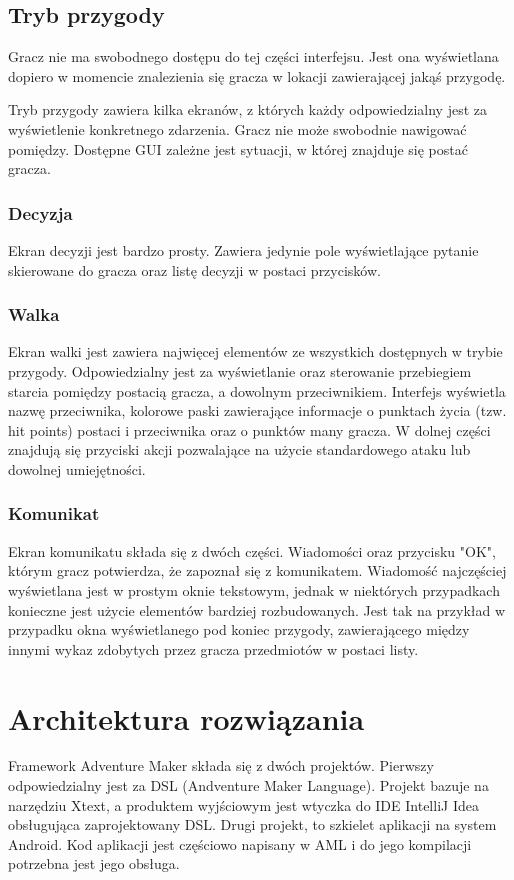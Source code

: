 \documentclass	{xmgr}
\begin{document}
\section{Tryb przygody}
Gracz nie ma swobodnego dostępu do tej części interfejsu. Jest ona wyświetlana dopiero w momencie znalezienia się gracza w lokacji zawierającej jakąś przygodę.

Tryb przygody zawiera kilka ekranów, z których każdy odpowiedzialny jest za wyświetlenie konkretnego zdarzenia. Gracz nie może swobodnie nawigować pomiędzy. Dostępne GUI zależne jest sytuacji, w której znajduje się postać gracza.
\subsection*{Decyzja}
Ekran decyzji jest bardzo prosty. Zawiera jedynie pole wyświetlające pytanie skierowane do gracza oraz listę decyzji w postaci przycisków.
\subsection*{Walka}
Ekran walki jest zawiera najwięcej elementów ze wszystkich dostępnych w trybie przygody. Odpowiedzialny jest za wyświetlanie oraz sterowanie przebiegiem starcia pomiędzy postacią gracza, a dowolnym przeciwnikiem. Interfejs wyświetla nazwę przeciwnika, kolorowe paski zawierające informacje o punktach życia (tzw. hit points) postaci i przeciwnika oraz o punktów many gracza. W dolnej części znajdują się przyciski akcji pozwalające na użycie standardowego ataku lub dowolnej umiejętności.
\subsection*{Komunikat}
Ekran komunikatu składa się z dwóch części. Wiadomości oraz przycisku "OK", którym gracz potwierdza, że zapoznał się z komunikatem. Wiadomość najczęściej wyświetlana jest w prostym oknie tekstowym, jednak w niektórych przypadkach konieczne jest użycie elementów bardziej rozbudowanych. Jest tak na przykład w przypadku okna wyświetlanego pod koniec przygody, zawierającego między innymi wykaz zdobytych przez gracza przedmiotów w postaci listy.

\chapter{Architektura rozwiązania}

Framework Adventure Maker składa się z dwóch projektów. Pierwszy odpowiedzialny jest za DSL (Andventure Maker Language). Projekt bazuje na narzędziu Xtext, a produktem wyjściowym jest wtyczka do IDE IntelliJ Idea obsługująca zaprojektowany DSL. Drugi projekt, to szkielet aplikacji na system Android. Kod aplikacji jest częściowo napisany w AML i do jego kompilacji potrzebna jest jego obsługa.
\end{document}
